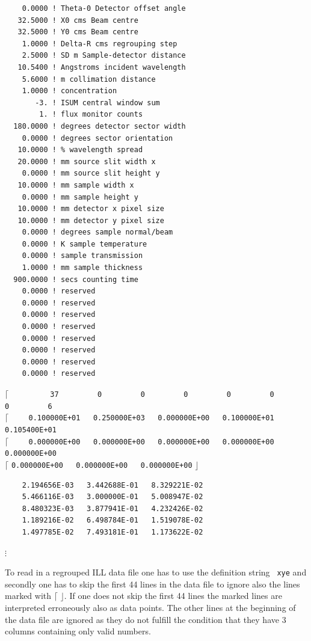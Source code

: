 \begin{description}
{\begin{verbatim}
    0.0000 ! Theta-0 Detector offset angle
   32.5000 ! X0 cms Beam centre
   32.5000 ! Y0 cms Beam centre
    1.0000 ! Delta-R cms regrouping step
    2.5000 ! SD m Sample-detector distance
   10.5400 ! Angstroms incident wavelength
    5.6000 ! m collimation distance
    1.0000 ! concentration
       -3. ! ISUM central window sum
        1. ! flux monitor counts
  180.0000 ! degrees detector sector width
    0.0000 ! degrees sector orientation
   10.0000 ! % wavelength spread
   20.0000 ! mm source slit width x
    0.0000 ! mm source slit height y
   10.0000 ! mm sample width x
    0.0000 ! mm sample height y
   10.0000 ! mm detector x pixel size
   10.0000 ! mm detector y pixel size
    0.0000 ! degrees sample normal/beam
    0.0000 ! K sample temperature
    0.0000 ! sample transmission
    1.0000 ! mm sample thickness
  900.0000 ! secs counting time
    0.0000 ! reserved
    0.0000 ! reserved
    0.0000 ! reserved
    0.0000 ! reserved
    0.0000 ! reserved
    0.0000 ! reserved
    0.0000 ! reserved
    0.0000 ! reserved
\end{verbatim}
\textcolor[rgb]{0.98,0.00,0.00}{$\mathbf{\lceil}$}
\verb"         37         0         0         0         0         0         0         6"\\
\textcolor[rgb]{1.0,1.00,1.00}{$\mathbf{\lceil}$}
\verb"    0.100000E+01   0.250000E+03   0.000000E+00   0.100000E+01   0.105400E+01"\\
\textcolor[rgb]{1.0,1.00,1.00}{$\mathbf{\lceil}$}
\verb"    0.000000E+00   0.000000E+00   0.000000E+00   0.000000E+00   0.000000E+00"\\
\textcolor[rgb]{1.0,1.00,1.00}{$\mathbf{\lceil}$}
\verb"0.000000E+00   0.000000E+00   0.000000E+00"
\textcolor[rgb]{0.98,0.00,0.00}{$\mathbf{\rfloor}$}
\begin{verbatim}
    2.194656E-03   3.442688E-01   8.329221E-02
    5.466116E-03   3.000000E-01   5.008947E-02
    8.480323E-03   3.877941E-01   4.232426E-02
    1.189216E-02   6.498784E-01   1.519078E-02
    1.497785E-02   7.493181E-01   1.173622E-02
\end{verbatim}
\centerline{$\vdots$ \hspace{5cm} ~} }
\noindent To read in a
regrouped ILL data file one has to use the definition string {\tt
xye} and secondly one has to skip the first 44 lines in the data
file to ignore also the lines marked with
\textcolor[rgb]{0.98,0.00,0.00}{$\mathbf{\lceil}$}
\textcolor[rgb]{0.98,0.00,0.00}{$\mathbf{\rfloor}$}. If one does not
skip the first 44 lines the marked lines are interpreted erroneously
also as data points. The other lines at the beginning of the data
file are ignored as they do not fulfill the condition that they have
3 columns containing only valid numbers.
\end{description}

